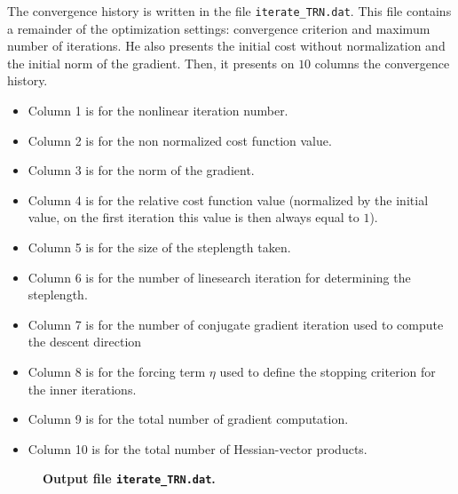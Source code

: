 \documentclass[a4paper,twoside,final,onecolumn,11pt,openright]{article}
\begin{document}
The convergence history is written in the file \texttt{iterate\_TRN.dat}. This file contains a remainder of the optimization settings: convergence criterion and maximum number of iterations. He also presents the initial cost without normalization and the initial norm of the gradient. Then, it presents on $10$ columns the convergence history. 
\begin{itemize}
\item Column 1 is for the nonlinear iteration number.
\item Column 2 is for the non normalized cost function value.
\item Column 3 is for the norm of the gradient.
\item Column 4 is for the relative cost function value (normalized by the initial value, on the first iteration this value is then always equal to $1$).
\item Column 5 is for the size of the steplength taken.
\item Column 6 is for the number of linesearch iteration for determining the steplength.
\item Column 7 is for the number of conjugate gradient iteration used to compute the descent direction
\item Column 8 is for the forcing term $\eta$ used to define the stopping criterion for the inner iterations. 
\item Column 9 is for the total number of gradient computation.
\item Column 10 is for the total number of Hessian-vector products.
\end{itemize}

\begin{figure}
\tiny
 
\normalsize
\begin{center}
\textbf{Output file \texttt{iterate\_TRN.dat}.} 
\end{center}
 \end{figure}
\end{document}
